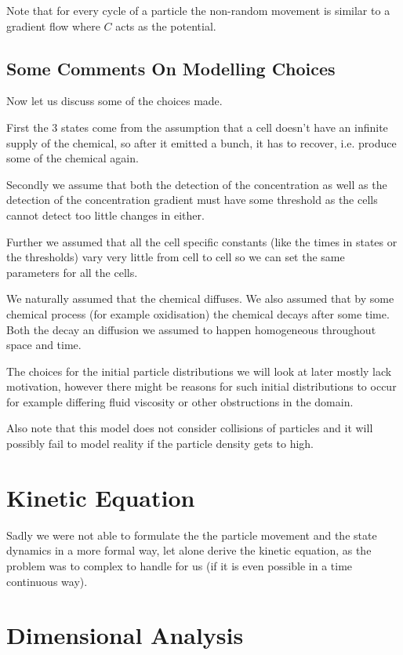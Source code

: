 \documentclass{class}
\begin{document}
Note that for every cycle of a particle the non-random movement is similar to a gradient flow where $C$ acts as the potential.

\subsection{Some Comments On Modelling Choices}

Now let us discuss some of the choices made.

First the 3 states come from the assumption that a cell doesn't have an infinite supply of the chemical, so after it emitted a bunch, it has to recover, i.e. produce some of the chemical again.

Secondly we assume that both the detection of the concentration as well as the detection of the concentration gradient must have some threshold as the cells cannot detect too little changes in either.

Further we assumed that all the cell specific constants (like the times in states or the thresholds) vary very little from cell to cell so we can set the same parameters for all the cells.

We naturally assumed that the chemical diffuses.
We also assumed that by some chemical process (for example oxidisation) the chemical decays after some time.
Both the decay an diffusion we assumed to happen homogeneous throughout space and time.

The choices for the initial particle distributions we will look at later mostly lack motivation, however there might be reasons for such initial distributions to occur for example differing fluid viscosity or other obstructions in the domain.

Also note that this model does not consider collisions of particles and it will possibly fail to model reality if the particle density gets to high.

\section{Kinetic Equation}

Sadly we were not able to formulate the the particle movement and the state dynamics in a more formal way, let alone derive the kinetic equation, as the problem was to complex to handle for us (if it is even possible in a time continuous way).

\section{Dimensional Analysis}
\end{document}
